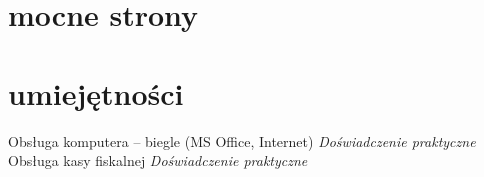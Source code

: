 \documentclass[]{konserw-cv} %
\begin{document}
\section{mocne strony}
\begin{skillslist}
\end{skillslist}


\section{umiejętności}

\begin{entrylist}
\entry
{}
{Obsługa komputera -- biegle (MS Office, Internet)}
{}
{\emph{Doświadczenie praktyczne}}
\entry
{}
{Obsługa kasy fiskalnej}
{}
{\emph{Doświadczenie praktyczne}}
\end{entrylist}
\end{document}
